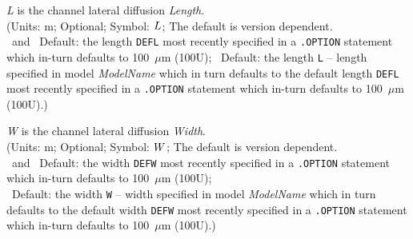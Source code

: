 \begin{widelist}
\item[{\it L}] is the channel lateral diffusion  {\it Length}.\\
               (Units: m; Optional; Symbol: $L$;
{ The default is version
	       dependent.\\
               \spicetwo\ and \spicethree\ Default: the
               length {\tt DEFL} most recently specified in a {\tt .OPTION}
               statement which in-turn defaults to 100~$\mu$m (100U);
	       \pspice\ }Default: the length
	       {\tt L} -- length specified in
               model {\it ModelName} which in turn defaults to the default
               length {\tt DEFL} most recently specified in a {\tt .OPTION}
               statement which in-turn defaults to 100~$\mu$m (100U).)
                 
\item[{\it W}] is the channel lateral diffusion {\it Width}.\\
               (Units: m; Optional; Symbol: $W$;
{The default is version dependent.\\
	       \spicetwo\ and \spicethree\ Default: the
               width {\tt DEFW} most recently specified in a {\tt .OPTION}
               statement which in-turn defaults to 100~$\mu$m (100U);\\
	       \pspice\ }Default: the width
	       {\tt W} -- width specified in
               model {\it ModelName} which in turn defaults to the default
               width {\tt DEFW} most recently specified in a {\tt .OPTION}
               statement which in-turn defaults to 100~$\mu$m (100U).)
\end{widelist}

~

